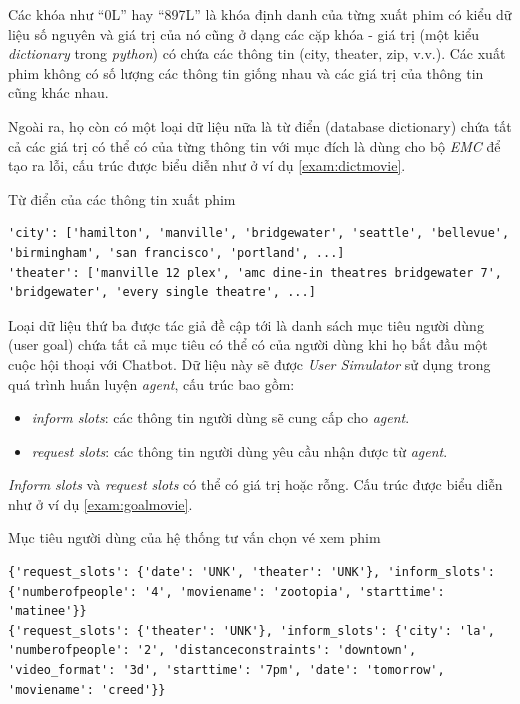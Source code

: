 Các khóa như \enquote{0L} hay \enquote{897L} là khóa định danh của
từng xuất phim có kiểu dữ liệu số nguyên và giá trị của nó cũng ở
dạng các cặp khóa - giá trị (một kiểu \textit{dictionary} trong
\textit{python}) có chứa các thông tin (city, theater, zip, v.v.).
Các xuất phim không có số lượng các thông tin giống nhau và các
giá trị của thông tin cũng khác nhau.

Ngoài ra, họ còn có một loại dữ liệu nữa là từ điển (database
dictionary) chứa tất cả các giá trị có thể có của từng thông tin với
mục đích là dùng cho bộ \textit{EMC} để tạo ra lỗi, cấu trúc được
biểu diễn như ở ví dụ \ref{exam:dictmovie}.

\renewcommand{\textboxenvname}{Ví dụ}
\begin{textbox}{Từ điển của các thông tin xuất phim}
\begin{Verbatim}[breaklines=true, breakanywhere=true]
'city': ['hamilton', 'manville', 'bridgewater', 'seattle', 'bellevue', 'birmingham', 'san francisco', 'portland', ...]
'theater': ['manville 12 plex', 'amc dine-in theatres bridgewater 7', 'bridgewater', 'every single theatre', ...]
\end{Verbatim}
\end{textbox}

Loại dữ liệu thứ ba được tác giả đề cập tới là danh sách mục tiêu
người dùng (user goal) chứa tất cả mục tiêu có thể có của người dùng
khi họ bắt đầu một cuộc hội thoại với Chatbot. Dữ liệu này sẽ được
\textit{User Simulator} sử dụng trong quá trình huấn luyện
\textit{agent}, cấu trúc bao gồm:

\begin{itemize}
    \item \textit{inform slots}: các thông tin người dùng sẽ cung cấp
    cho \textit{agent}.
    \item \textit{request slots}: các thông tin người dùng yêu cầu
    nhận được từ \textit{agent}.
\end{itemize}

\textit{Inform slots} và \textit{request slots} có thể có giá trị
hoặc rỗng. Cấu trúc được biểu diễn như ở ví dụ \ref{exam:goalmovie}.

\renewcommand{\textboxenvname}{Ví dụ}
\begin{textbox}{Mục tiêu người dùng của hệ thống tư vấn chọn vé xem phim}
\begin{Verbatim}[breaklines=true, breakanywhere=true]
{'request_slots': {'date': 'UNK', 'theater': 'UNK'}, 'inform_slots': {'numberofpeople': '4', 'moviename': 'zootopia', 'starttime': 'matinee'}}
{'request_slots': {'theater': 'UNK'}, 'inform_slots': {'city': 'la', 'numberofpeople': '2', 'distanceconstraints': 'downtown', 'video_format': '3d', 'starttime': '7pm', 'date': 'tomorrow', 'moviename': 'creed'}}
\end{Verbatim}
\end{textbox}


